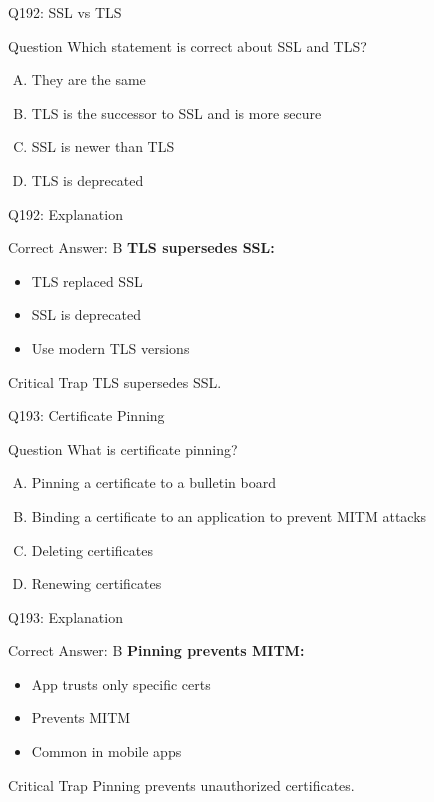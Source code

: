 \documentclass{beamer}
\begin{document}
	\begin{frame}{Q192: SSL vs TLS}
		\begin{block}{Question}
			Which statement is correct about SSL and TLS?
		\end{block}
		\begin{enumerate}[(A)]
			\item They are the same
			\item TLS is the successor to SSL and is more secure
			\item SSL is newer than TLS
			\item TLS is deprecated
		\end{enumerate}
	\end{frame}
	
	\begin{frame}{Q192: Explanation}
		\begin{block}{Correct Answer: B}
			\textbf{TLS supersedes SSL:}
			\begin{itemize}
				\item TLS replaced SSL
				\item SSL is deprecated
				\item Use modern TLS versions
			\end{itemize}
		\end{block}
		\begin{alertblock}{Critical Trap}
			TLS supersedes SSL.
		\end{alertblock}
	\end{frame}
	
	\begin{frame}{Q193: Certificate Pinning}
		\begin{block}{Question}
			What is certificate pinning?
		\end{block}
		\begin{enumerate}[(A)]
			\item Pinning a certificate to a bulletin board
			\item Binding a certificate to an application to prevent MITM attacks
			\item Deleting certificates
			\item Renewing certificates
		\end{enumerate}
	\end{frame}
	
	\begin{frame}{Q193: Explanation}
		\begin{block}{Correct Answer: B}
			\textbf{Pinning prevents MITM:}
			\begin{itemize}
				\item App trusts only specific certs
				\item Prevents MITM
				\item Common in mobile apps
			\end{itemize}
		\end{block}
		\begin{alertblock}{Critical Trap}
			Pinning prevents unauthorized certificates.
		\end{alertblock}
	\end{frame}
	
\end{document}
